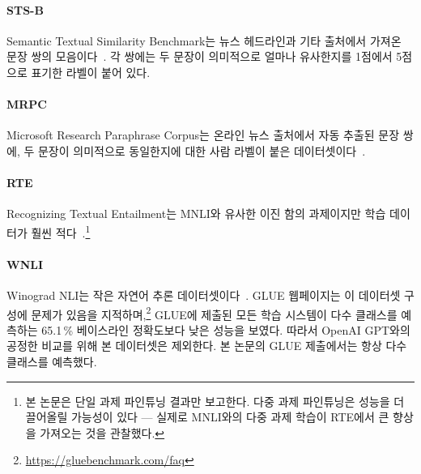 \paragraph{STS-B} Semantic Textual Similarity Benchmark는 뉴스 헤드라인과 기타 출처에서 가져온 문장 쌍의 모음이다~\cite{cer-etal:2017}. 각 쌍에는 두 문장이 의미적으로 얼마나 유사한지를 1점에서 5점으로 표기한 라벨이 붙어 있다.

\paragraph{MRPC} Microsoft Research Paraphrase Corpus는 온라인 뉴스 출처에서 자동 추출된 문장 쌍에, 두 문장이 의미적으로 동일한지에 대한 사람 라벨이 붙은 데이터셋이다~\cite{dolan-brockett:2005:_autom}.

\paragraph{RTE} Recognizing Textual Entailment는 MNLI와 유사한 이진 함의 과제이지만 학습 데이터가 훨씬 적다~\cite{bentivogli-etal:2009}.\footnote{본 논문은 단일 과제 파인튜닝 결과만 보고한다. 다중 과제 파인튜닝은 성능을 더 끌어올릴 가능성이 있다 — 실제로 MNLI와의 다중 과제 학습이 RTE에서 큰 향상을 가져오는 것을 관찰했다.}

\paragraph{WNLI} Winograd NLI는 작은 자연어 추론 데이터셋이다~\cite{levesque-davis-morgenstern:2011:_winog}. GLUE 웹페이지는 이 데이터셋 구성에 문제가 있음을 지적하며,\footnote{\url{https://gluebenchmark.com/faq}} GLUE에 제출된 모든 학습 시스템이 다수 클래스를 예측하는 65.1\,\% 베이스라인 정확도보다 낮은 성능을 보였다. 따라서 OpenAI GPT와의 공정한 비교를 위해 본 데이터셋은 제외한다. 본 논문의 GLUE 제출에서는 항상 다수 클래스를 예측했다.



